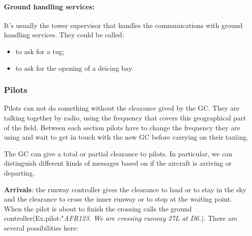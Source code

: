 \documentclass{article}
\begin{document}
\paragraph{Ground handling services:}
It's usually the tower supervisor that handles the communications with ground handling services. They could be called:
\begin{itemize}
	\item to ask for a tug;
	\item to ask for the opening of a deicing bay.
\end{itemize}

\subsubsection*{Pilots}
Pilots can not do something without the clearance gived by the GC. 
They are talking together by radio, using the frequency that covers this geographical part of the field. Between each section pilots have to change the frequency they are using and wait to get in touch with the new GC before carrying on their taxiing. 

The GC can give a total or partial clearance to pilots. In particular, we can distinguish different kinds of messages based on if the aircraft is arriving or departing.

\textbf{Arrivals}: the runway controller gives the clearance to land or to stay in the sky and the clearance to cross the inner runway or to stop at the waiting point. When the pilot is about to finish the crossing calls the ground controller(Ex.pilot:"\textit{AFR123. We are crossing runway 27L at D6.}). There are several possibilities here:
\end{document}
